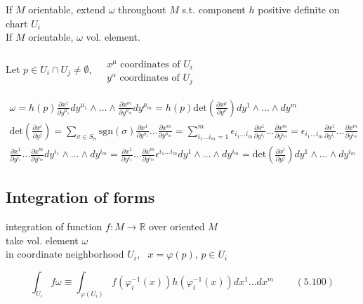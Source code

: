 \documentclass{book}
\begin{document}
If $M$ orientable, extend $\omega$ throughout $M$ s.t. component $h$ positive definite on chart $U_i$ \\
If $M$ orientable, $\omega$ vol. element. 

Let $p\in U_i \cap U_j \neq \emptyset$, $\begin{aligned} & \quad \\
  & x^{\mu} \text{ coordinates of $U_i$ } \\ 
& y^{\alpha} \text{ coordinates of $U_j$ } \end{aligned}$

\[
\begin{gathered}
  \omega = h(p) \frac{ \partial x^1}{ \partial y^{\mu_1} } dy^{\mu_1} \wedge \dots \wedge \frac{ \partial x^m}{ \partial y^{\mu_m} }dy^{\mu_m} = h(p) \text{det}{ \left( \frac{ \partial x^{\mu} }{ \partial y^{\nu} } \right) } dy^1 \wedge \dots \wedge dy^m \\
 \text{det}{ \left( \frac{ \partial x^i }{ \partial y^j } \right) } = \sum_{ \sigma \in S_n} \text{sgn}{ (\sigma)} \frac{ \partial x^1}{ \partial y^{\sigma_1} } \dots \frac{ \partial x^m}{ \partial y^{\sigma_m}} = \sum^m_{ i_1\dots i_m = 1} \epsilon_{i_1 \dots i_m} \frac{ \partial x^1}{ \partial y^{i_1} } \dots \frac{ \partial x^m}{ \partial y^{i_m} } = \epsilon_{i_1 \dots i_m } \frac{ \partial x^1}{ \partial y^{i_1} } \dots \frac{ \partial x^m}{ \partial y^{i_m}} \\
\frac{ \partial x^1}{ \partial y^{i_1}} \dots \frac{ \partial x^m}{ \partial y^{i_m} } dy^{i_1} \wedge \dots \wedge dy^{i_m} = \frac{ \partial x^1}{ \partial y^{i_1}} \dots \frac{ \partial x^m}{ \partial y^{i_m}} \epsilon^{i_1 \dots i_m} dy^1 \wedge \dots \wedge dy^{i_m} = \text{det}{ \left( \frac{ \partial x^i}{ \partial y^j} \right) } dy^1 \wedge \dots \wedge dy^{i_m}
\end{gathered}
\]




\subsection{ Integration of forms }

integration of function $f:M \to \mathbb{R}$ over oriented $M$ \\
take vol. element $\omega$ \\
in coordinate neighborhood $U_i$, \, $x=\varphi(p)$, $p\in U_i$

\begin{equation}
  \int_{U_i} f\omega \equiv \int_{\varphi{ (U_i)} } f(\varphi_i^{-1}(x)) h(\varphi_i^{-1}(x)) dx^1 \dots dx^m \quad \quad \, (5.100)
\end{equation}
\end{document}
